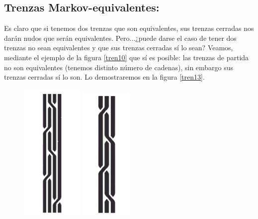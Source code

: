 \newpage
\begin{center}
	\subsection{Trenzas Markov-equivalentes:}\label{Markov}
\end{center}
Es claro que si tenemos dos trenzas que son equivalentes, sus trenzas cerradas nos darán nudos que serán equivalentes. Pero...¿puede darse el caso de tener dos trenzas no sean equivalentes y que sus trenzas cerradas sí lo sean? Veamos, mediante el ejemplo de la figura \ref{tren10} que sí es posible: las trenzas de partida no son equivalentes (tenemos distinto número de cadenas), sin embargo sus trenzas cerradas sí lo son. Lo demostraremos en la figura \ref{tren13}.\\
\begin{figure}[h!]
	\centering
	\includegraphics[width=3cm]{itrenzas/t1pro.png}
	\includegraphics[width=2.5cm]{itrenzas/t2pro.png}
	

\end{figure}
